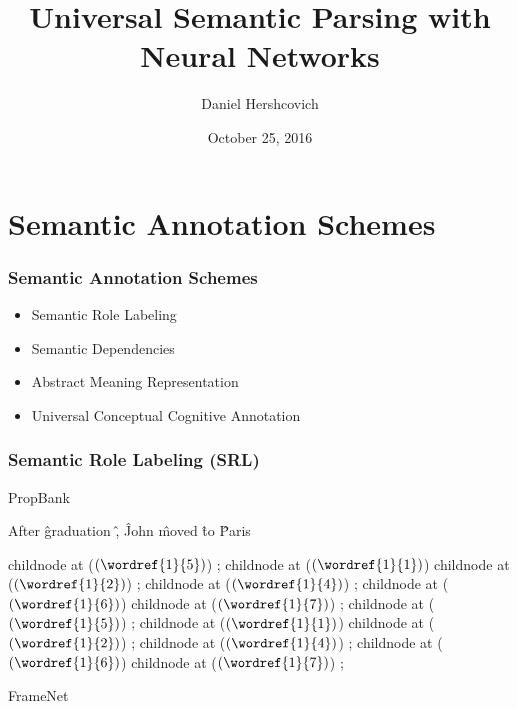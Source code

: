 \documentclass[t]{beamer}
\begin{document}
\title[]{Universal Semantic Parsing with Neural Networks}
\author{Daniel Hershcovich}
\date{October 25, 2016}

\begin{frame}
\titlepage
\end{frame}


\section{Semantic Annotation Schemes}

\begin{frame}
\frametitle{Semantic Annotation Schemes}
\begin{itemize}
 \item Semantic Role Labeling
 \item Semantic Dependencies
 \item Abstract Meaning Representation
 \item Universal Conceptual Cognitive Annotation
\end{itemize}
\end{frame}

\begin{frame}
\frametitle{Semantic Role Labeling (SRL)}
\centering
\vspace*{\fill}
{\color{blue} PropBank}
\vspace*{\fill}

\begin{dependency}
	\begin{deptext}[column sep=1.5em,ampersand replacement=\^]
	After \^ graduation \^ , \^ John \^ moved \^ to \^ Paris \\
	\end{deptext}
	child{node at ($(\wordref{1}{5})$) {}};
	child{node at ($(\wordref{1}{1})$) {}}
	child{node at ($(\wordref{1}{2})$) {}};
	child{node at ($(\wordref{1}{4})$) {}};
	child{node at ($(\wordref{1}{6})$) {}}
	child{node at ($(\wordref{1}{7})$) {}};
	child{node at ($(\wordref{1}{5})$) {}};
	child{node at ($(\wordref{1}{1})$) {}}
	child{node at ($(\wordref{1}{2})$) {}};
	child{node at ($(\wordref{1}{4})$) {}};
	child{node at ($(\wordref{1}{6})$) {}}
	child{node at ($(\wordref{1}{7})$) {}};
\end{dependency}

\vspace*{\fill}
{\color{red} FrameNet}
\end{frame}
\end{document}
